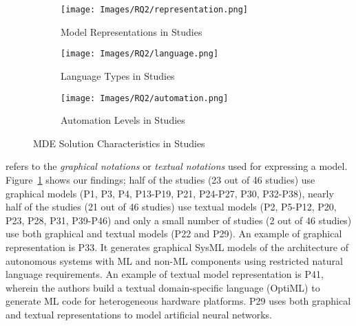 \begin{figure}[htbp]
    \centering
    \begin{subfigure}{0.3\textwidth}
    \texttt{[image: Images/RQ2/representation.png]}
    \caption{Model Representations in Studies}
    \label{fig:ModelRepresentation}
    \end{subfigure}
\hfill
    \begin{subfigure}{0.3\textwidth}
    \centering
\texttt{[image: Images/RQ2/language.png]}
    \caption{Language Types in Studies}
    \label{fig:ModelingLanguages}
\end{subfigure}
\hfill
    \begin{subfigure}{0.3\textwidth}
    \texttt{[image: Images/RQ2/automation.png]}
    \caption{Automation Levels in Studies}
    \label{fig:AutomationLevels}
    \end{subfigure}
    \caption{MDE Solution Characteristics in Studies}
\end{figure}

 refers to the \textit{graphical notations} or \textit{textual notations} used for expressing a model. Figure~\ref{fig:ModelRepresentation} shows our findings; half of the studies (23 out of 46 studies) use graphical models (P1, P3, P4, P13-P19, P21, P24-P27, P30, P32-P38), nearly half of the studies (21 out of 46 studies) use textual models (P2, P5-P12, P20, P23, P28, P31, P39-P46) and only a small number of studies (2 out of 46 studies) use both graphical and textual models (P22 and P29). An example of graphical representation is P33. It generates graphical SysML models of the architecture of autonomous systems with ML and non-ML components using restricted natural language requirements. An example of textual model representation is P41, wherein the authors build a textual domain-specific language (OptiML) to generate ML code for heterogeneous hardware platforms. P29 uses both graphical and textual representations to model artificial neural networks.\\

